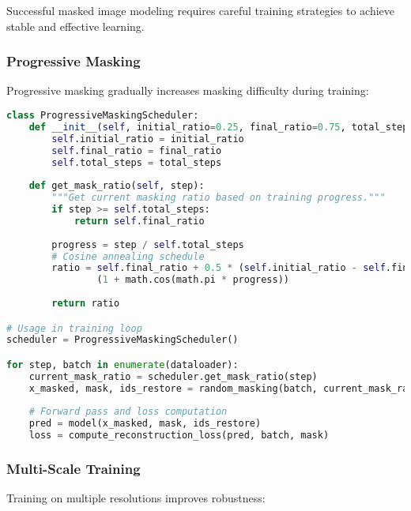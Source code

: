 Successful masked image modeling requires careful training strategies to achieve stable and effective learning.

\subsubsection{Progressive Masking}

Progressive masking gradually increases masking difficulty during training:

\begin{lstlisting}[language=Python, caption=Progressive masking curriculum for stable training]
class ProgressiveMaskingScheduler:
    def __init__(self, initial_ratio=0.25, final_ratio=0.75, total_steps=100000):
        self.initial_ratio = initial_ratio
        self.final_ratio = final_ratio
        self.total_steps = total_steps
    
    def get_mask_ratio(self, step):
        """Get current masking ratio based on training progress."""
        if step >= self.total_steps:
            return self.final_ratio
        
        progress = step / self.total_steps
        # Cosine annealing schedule
        ratio = self.final_ratio + 0.5 * (self.initial_ratio - self.final_ratio) * \
                (1 + math.cos(math.pi * progress))
        
        return ratio

# Usage in training loop
scheduler = ProgressiveMaskingScheduler()

for step, batch in enumerate(dataloader):
    current_mask_ratio = scheduler.get_mask_ratio(step)
    x_masked, mask, ids_restore = random_masking(batch, current_mask_ratio)
    
    # Forward pass and loss computation
    pred = model(x_masked, mask, ids_restore)
    loss = compute_reconstruction_loss(pred, batch, mask)
\end{lstlisting}

\subsubsection{Multi-Scale Training}

Training on multiple resolutions improves robustness:

